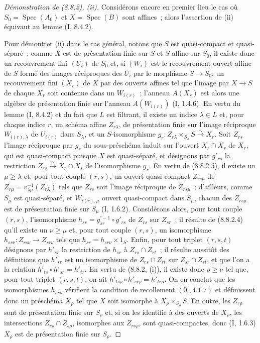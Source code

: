 \begin{proof}[Démonstration de (8.8.2), (ii)]
Considérons encore en premier lieu le cas où $S_0=\operatorname{Spec}(A_0)$ et
$X=\operatorname{Spec}(B)$ sont affines~; alors l'assertion de (ii) équivaut
au lemme (I, 8.4.2).

Pour démontrer (ii) dans le cas général, notons que $S$ est quasi-compact et
quasi-séparé~; comme $X$ est de présentation finie sur $S$ et $S$ affine sur
$S_0$, il existe donc un recouvrement fini $(U_i)$ de $S_0$ et, si $(W_i)$ est
le recouvrement ouvert affine de $S$ formé des images réciproques des $U_i$
par le morphisme $S\to S_0$, un recouvrement fini $(X_r)$ de $X$ par des
ouverts affines tel que l'image par $X\to S$ de chaque $X_r$ soit contenue
dans un $W_{i(r)}$~; l'anneau $A(X_r)$ est alors une algèbre de présentation
finie sur l'anneau $A(W_{i(r)})$ (I, 1.4.6). En vertu du lemme (I, 8.4.2) et du
fait que $L$ est filtrant, il existe un indice $\lambda\in L$ et, pour chaque
indice $r$, un schéma affine $Z_{r\lambda}$, de présentation finie sur l'image
réciproque $W_{i(r),\lambda}$ de $U_{i(r)}$ dans $S_\lambda$, et un
$S$-isomorphisme
$g_r:Z_{r\lambda}\times_{S_\lambda}S\xrightarrow{\sim}X_r$. Soit $Z_{rs}$
l'image réciproque par $g_r$ du sous-préschéma induit sur l'ouvert
$X_r\cap X_s$ de $X_r$, qui est quasi-compact puisque $X$ est quasi-séparé,
et désignons par $g'_{rs}$ la restriction
$Z_{rs}\xrightarrow{\sim}X_r\cap X_s$ de l'isomorphisme $g_r$. En vertu de
(8.8.2.5), il existe un $\mu\geq\lambda$ et, pour tout couple $(r,s)$, un
ouvert quasi-compact $Z_{rs\mu}$ de
$Z_{r\mu}=v_{\lambda\mu}^{-1}(Z_{r\lambda})$ tels que $Z_{rs}$ soit l'image
réciproque de $Z_{rs\mu}$~; d'ailleurs, comme $S_\mu$ est quasi-séparé, et
$W_{i(r),\mu}$ ouvert quasi-compact dans $S_\mu$, chacun des $Z_{rs\mu}$ est
de présentation finie sur $S_\mu$ (I, 1.6.2). Considérons alors, pour tout
couple $(r,s)$, l'isomorphisme
$h_{sr}=g_{sr}^{'-1}\circ g'_{rs}$ de $Z_{rs}$ sur $Z_{sr}$~; il résulte de
(8.8.2.4) qu'il existe un $\nu\geq\mu$ et, pour tout couple $(r,s)$, un
isomorphisme $h_{sr\nu}:Z_{rs\nu}\to Z_{sr\nu}$ tels que
$h_{sr}=h_{sr\nu}\times1_S$. Enfin, pour tout triplet $(r,s,t)$ désignons par
$h'_{sr}$ la restriction de $h_{sr}$ à
$Z_{rs}\cap Z_{rt}$~; il résulte aussitôt des définitions que $h'_{sr}$ est un
isomorphisme de $Z_{rs}\cap Z_{rt}$ sur $Z_{sr}\cap Z_{st}$, et que l'on a la
relation $h'_{ts}\circ h'_{sr}=h'_{tr}$. En vertu de (8.8.2, (i)), il existe
donc $\rho\geq\nu$ tel que, pour tout triplet $(r,s,t)$, on ait
$h'_{ts\rho}\circ h'_{sr\rho}=h'_{tr\rho}$. On en conclut que les
isomorphismes $h_{sr\rho}$ vérifient la condition de recollement
$(0_{\mathrm I}, 4.1.7)$ et définissent donc un préschéma $X_\rho$ tel que $X$
soit isomorphe à $X_\rho\times_{S_\rho}S$. En outre, les $Z_{r\rho}$ sont de
présentation finie sur $S_\rho$ et, si on les identifie à des ouverts de
$X_\rho$, les intersections $Z_{r\rho}\cap Z_{s\rho}$, isomorphes aux
$Z_{rs\rho}$, sont quasi-compactes, donc (I, 1.6.3) $X_\rho$ est de
présentation finie sur $S_\rho$.
\end{proof}

